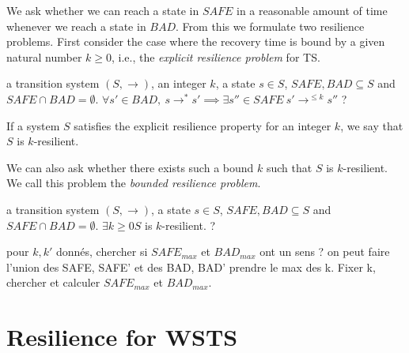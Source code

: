 
We ask whether we can reach a state 
in 
%
$SAFE$  in a reasonable amount of time whenever we reach a state 
in
%
$BAD$. 
From this we formulate two resilience problems. First consider the case where the recovery time
is bound by a given natural number $k \geq 0$, i.e., the \emph{explicit resilience problem} for TS.

{a transition system $(S,\rightarrow)$, an integer $k$, a state $s \in S$, $SAFE, BAD \subseteq S$ and $SAFE \cap BAD = \emptyset$.}
{$\forall s' \in BAD, ~ s \rightarrow^* s' \implies \exists s'' \in SAFE ~ s' \rightarrow^{\leq k} s''$ ?\newline}

If a system $S$ satisfies the explicit resilience property for an integer $k$, we say that $S$ is $k$-resilient.


We can also ask whether there exists such a bound $k$ such that $S$ is $k$-resilient. We call this problem the \emph{bounded resilience problem}.

%
%


{a transition system $(S,\rightarrow)$, a state $s \in S$, $SAFE, BAD \subseteq S$ and $SAFE \cap BAD = \emptyset$.}
{$\exists k \geq 0  S$ is $k$-resilient. ?\newline}
\fi


pour $k,k'$ donnés, chercher si $SAFE_{max}$ et $BAD_{max}$ ont un sens ? on peut faire l'union des SAFE, SAFE' et des BAD, BAD' prendre le max des k. Fixer k, chercher et calculer $SAFE_{max}$ et $BAD_{max}$.


\section{Resilience for WSTS}

